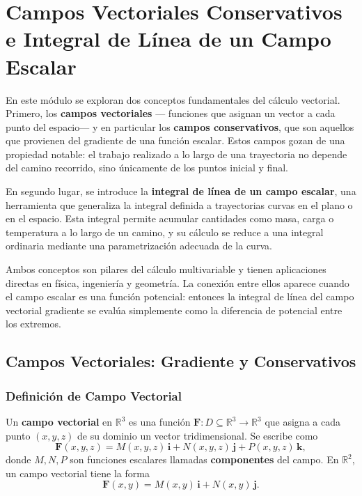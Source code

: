 
\chapter{Campos Vectoriales Conservativos e Integral de Línea de un Campo Escalar}

En este módulo se exploran dos conceptos fundamentales del cálculo
vectorial. Primero, los \textbf{campos vectoriales} — funciones que
asignan un vector a cada punto del espacio— y en particular los
\textbf{campos conservativos}, que son aquellos que provienen del
gradiente de una función escalar. Estos campos gozan de una propiedad
notable: el trabajo realizado a lo largo de una trayectoria no depende
del camino recorrido, sino únicamente de los puntos inicial y final.

En segundo lugar, se introduce la \textbf{integral de línea de un campo
escalar}, una herramienta que generaliza la integral definida a
trayectorias curvas en el plano o en el espacio. Esta integral permite
acumular cantidades como masa, carga o temperatura a lo largo de un
camino, y su cálculo se reduce a una integral ordinaria mediante una
parametrización adecuada de la curva.

Ambos conceptos son pilares del cálculo multivariable y tienen
aplicaciones directas en física, ingeniería y geometría. La conexión
entre ellos aparece cuando el campo escalar es una función potencial:
entonces la integral de línea del campo vectorial gradiente se evalúa
simplemente como la diferencia de potencial entre los extremos.

\section{Campos Vectoriales: Gradiente y Conservativos}

\subsection*{Definición de Campo Vectorial}

Un \textbf{campo vectorial} en \(\mathbb{R}^3\) es una función
\(\mathbf{F}: D \subseteq \mathbb{R}^3 \to \mathbb{R}^3\) que asigna a
cada punto \((x,y,z)\) de su dominio un vector tridimensional. Se
escribe como
\[
\mathbf{F}(x,y,z) = M(x,y,z)\,\mathbf{i} + N(x,y,z)\,\mathbf{j}
+ P(x,y,z)\,\mathbf{k},
\]
donde \(M,N,P\) son funciones escalares llamadas \textbf{componentes}
del campo. En \(\mathbb{R}^2\), un campo vectorial tiene la forma
\[
\mathbf{F}(x,y) = M(x,y)\,\mathbf{i} + N(x,y)\,\mathbf{j}.
\]

